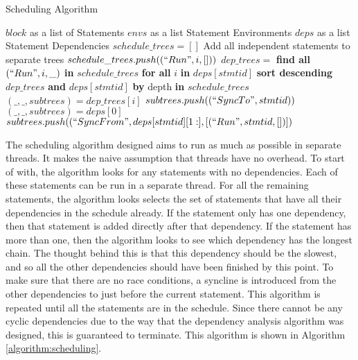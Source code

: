 \begin{algorithm}[H]
\caption{Scheduling Algorithm}
\label{algorithm:scheduling}
\begin{algorithmic}[1]
    \Require $block$ as a list of Statements
    \Require $envs$ as a list Statement Environments
    \Require $deps$ as a list Statement Dependencies
    \State $schedule\_trees = []$
     \Comment Add all independent statements to separate trees
            \State $schedule\_trees.push((``Run", i, []))$
        \EndIf
    \EndFor
                \State $dep\_trees =$ \textbf{find all} $(``Run", i, \_)$ \textbf{in} $schedule\_trees$ \textbf{for all} $i$ \textbf{in} $deps[stmtid]$
                \State \textbf{sort descending} $dep\_trees$ \textbf{and} $deps[stmtid]$ \textbf{by} depth \textbf{in} $schedule\_trees$
                    \State $(\_,\_,subtrees) = dep\_trees[i]$
                    \State $subtrees.push((``SyncTo", stmtid))$
                \EndFor
                \State $(\_,\_,subtrees) = deps[0]$
                \State $subtrees.push((``SyncFrom", deps[stmtid][1:], [(``Run", stmtid, [])])$
            \EndIf
        \EndFor
    \EndWhile
\end{algorithmic}
\end{algorithm}

The scheduling algorithm designed aims to run as much as possible in separate threads. It makes the naive assumption that threads have no overhead. To start of with, the algorithm looks for any statements with no dependencies. Each of these statements can be run in a separate thread. For all the remaining statements, the algorithm looks selects the set of statements that have all their dependencies in the schedule already. If the statement only has one dependency, then that statement is added directly after that dependency. If the statement has more than one, then the algorithm looks to see which dependency has the longest chain. The thought behind this is that this dependency should be the slowest, and so all the other dependencies should have been finished by this point. To make sure that there are no race conditions, a syncline is introduced from the other dependencies to just before the current statement. This algorithm is repeated until all the statements are in the schedule. Since there cannot be any cyclic dependencies due to the way that the dependency analysis algorithm was designed, this is guaranteed to terminate. This algorithm is shown in Algorithm \autoref{algorithm:scheduling}.
